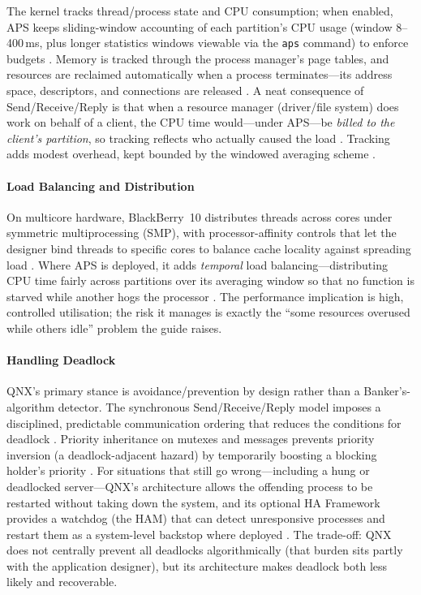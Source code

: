 The kernel tracks thread/process state and CPU consumption; when
enabled, APS keeps sliding-window accounting of each partition's CPU
usage (window 8--400\,ms, plus longer statistics windows viewable via
the \texttt{aps} command) to enforce budgets
\citep{qnx_aps, qnx_aps_cpu_percent}. Memory is tracked through the
process manager's page tables, and resources are reclaimed
automatically when a process terminates---its address space,
descriptors, and connections are released \citep{qnx_memman}. A neat
consequence of Send/Receive/Reply is that when a resource manager
(driver/file system) does work on behalf of a client, the CPU time
would---under APS---be \emph{billed to the client's partition}, so
tracking reflects who actually caused the load \citep{qnx_aps}. Tracking adds modest
overhead, kept bounded by the windowed averaging scheme
\citep{qnx_aps_cpu_percent}.

\paragraph{Load Balancing and Distribution}

On multicore hardware, BlackBerry~10 distributes threads across cores
under symmetric multiprocessing (SMP), with processor-affinity controls
that let the designer bind threads to specific cores to balance cache
locality against spreading load \citep{qnx_smp_multicore}. Where APS
is deployed, it adds \emph{temporal} load balancing---distributing CPU
time fairly across partitions over its averaging window so that no
function is starved while another hogs the processor \citep{qnx_aps}. The performance
implication is high, controlled utilisation; the risk it manages is
exactly the ``some resources overused while others idle'' problem the
guide raises.

\paragraph{Handling Deadlock}

QNX's primary stance is avoidance/prevention by design rather than a
Banker's-algorithm detector. The synchronous Send/Receive/Reply model
imposes a disciplined, predictable communication ordering that reduces
the conditions for deadlock \citep{qnx_ipc}. Priority inheritance on
mutexes and messages prevents priority inversion (a deadlock-adjacent
hazard) by temporarily boosting a blocking holder's priority
\citep{qnx_kernel_sysarch, qnx_ipc}. For situations that still go
wrong---including a hung or deadlocked server---QNX's architecture
allows the offending process to be restarted without taking down the
system, and its optional HA Framework provides a watchdog (the HAM)
that can detect unresponsive processes and restart them as a
system-level backstop where deployed \citep{qnx_ham}. The trade-off: QNX does not centrally prevent
all deadlocks algorithmically (that burden sits partly with the
application designer), but its architecture makes deadlock both less
likely and recoverable.

